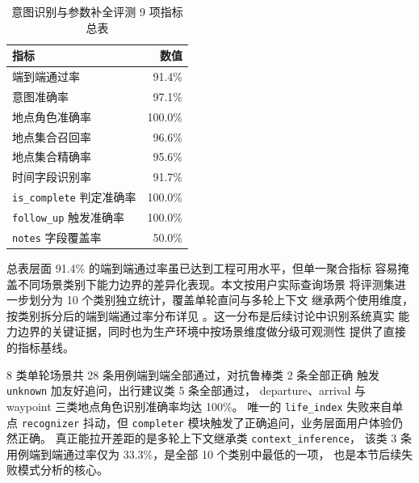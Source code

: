 \begin{table}[H]
    \centering
    \caption{意图识别与参数补全评测 9 项指标总表}
    \label{tab:intent-overall}
    \song\wuhao
    \begin{tabular}{lr}
        \toprule
        指标 & 数值 \\
        \midrule
        端到端通过率 & 91.4\% \\
        意图准确率 & 97.1\% \\
        地点角色准确率 & 100.0\% \\
        地点集合召回率 & 96.6\% \\
        地点集合精确率 & 95.6\% \\
        时间字段识别率 & 91.7\% \\
        \texttt{is\_\bk{}complete} 判定准确率 & 100.0\% \\
        \texttt{follow\_\bk{}up} 触发准确率 & 100.0\% \\
        \texttt{notes} 字段覆盖率 & 50.0\% \\
        \bottomrule
    \end{tabular}
\end{table}

总表层面 91.4\% 的端到端通过率虽已达到工程可用水平，但单一聚合指标
容易掩盖不同场景类别下能力边界的差异化表现。本文按用户实际查询场景
将评测集进一步划分为 10 个类别独立统计，覆盖单轮直问与多轮上下文
继承两个使用维度，按类别拆分后的端到端通过率分布详见
。这一分布是后续讨论中识别系统真实
能力边界的关键证据，同时也为生产环境中按场景维度做分级可观测性
提供了直接的指标基线。

8 类单轮场景共 28 条用例端到端全部通过，对抗鲁棒类 2 条全部正确
触发 \texttt{unknown} 加友好追问，出行建议类 5 条全部通过，
departure、arrival 与 waypoint 三类地点角色识别准确率均达 100\%。
唯一的 \texttt{life\_\bk{}index} 失败来自单点 \texttt{recognizer} 抖动，但
\texttt{completer} 模块触发了正确追问，业务层面用户体验仍然正确。
真正能拉开差距的是多轮上下文继承类 \texttt{context\_\bk{}inference}，
该类 3 条用例端到端通过率仅为 33.3\%，是全部 10 个类别中最低的一项，
也是本节后续失败模式分析的核心。

